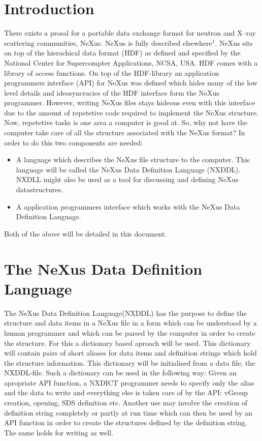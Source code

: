 \documentclass[12pt]{article}
\begin{document}
\section{Introduction}
 There exists a prosal for a portable data exchange format for neutron and
 X--ray scattering communities, NeXus. NeXus is fully described
 elsewhere$^{1}$. NeXus sits on top of the hierachical data format (HDF) as
 defined and specified by the National Center for Supercompter Applications, 
 NCSA, USA. HDF comes with a library of access functions. On top of the
 HDF-library an application programmers interface (API) for NeXus was
 defined which hides many of the low level details and ideosyncracies of
 the HDF interface form the NeXus programmer. However, writing NeXus files stays
 hideous even with this interface due to the amount of repetetive code
 required to  implement the NeXus structure. Now, repetetive tasks is one
 area a computer is good at. So, why not have the computer take care of all
 the structure associated with the NeXus format? In order to do this two
 components are needed:
\begin{itemize}
\item A language which describes the NeXus file structure to the computer.
  This language will be called the NeXus Data Definition Language (NXDDL).
  NXDLL might also be used as a tool for discussing and defining NeXus
  datastructures.
\item A application programmers interface which works with the NeXus Data 
 Definition Language.
\end{itemize}
Both of the above will be detailed in this document.

\section{The NeXus Data Definition Language}
The NeXus Data Definition Language(NXDDL) has the purpose to define the structure
and data items in a NeXus file in a form which can be understood by a human
programmer and which can be parsed by the computer in order to create the 
structure. 
For this a dictionary based aproach will be used. This dictionary
will contain pairs of short aliases for data items and definition strings 
which hold the structure information. This dictionary will
be initialised from a data file, the NXDDL-file. Such a dictionary can be
used in the following way: Given an apropriate API function, a NXDICT
programmer  needs to specify only the alias and the data to write and 
everything else is taken care of by the API: vGroup creation, opening,
SDS definition etc. Another use may involve the creation of definition string
completely or partly at run time which can then be used by an API function
in order to create the structures defined by the definition string. The same
holds for writing as well.
\end{document}
